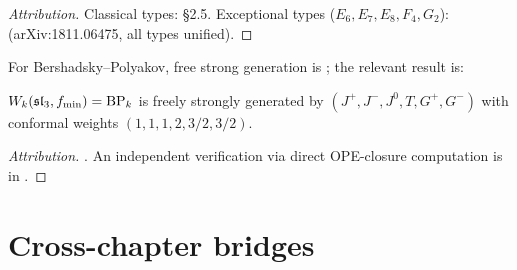 \begin{proof}[Attribution]
Classical types: \cite{Molev07} \S2.5. Exceptional types
($E_6, E_7, E_8, F_4, G_2$): \cite{GuayRegelskisWendlandt18}
(arXiv:1811.06475, all types unified).
\end{proof}

For Bershadsky--Polyakov, free strong generation is
\cite{deBoerTjin93}; the relevant result is:

\begin{theorem}
\label{thm:BP-free}
\ClaimStatusProvedElsewhere
$W_k(\mathfrak{sl}_3, f_{\mathrm{min}}) = \mathrm{BP}_k$ is freely strongly generated
by $(J^+, J^-, J^0, T, G^+, G^-)$ with conformal weights
$(1, 1, 1, 2, 3/2, 3/2)$.
\end{theorem}

\begin{proof}[Attribution]
\cite{deBoerTjin93}. An independent verification via direct
OPE-closure computation is in
\cite[\S5]{Creutzig-Linshaw-Nakatsuka23}.
\end{proof}

\section{Cross-chapter bridges}
\label{sec:ucqg-cross-bridges}

